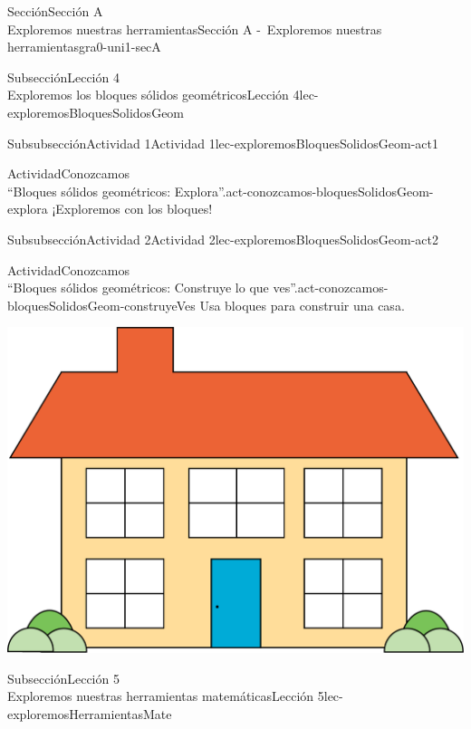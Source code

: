 \begin{sectionptx}{Sección}{{\Large Sección A\\}Exploremos nuestras herramientas}{}{Sección A -~Exploremos nuestras herramientas}{}{}{gra0-uni1-secA}
\begin{subsectionptx}{Subsección}{{\normalsize Lección 4\\[-0.05cm]}Exploremos los bloques sólidos geométricos}{}{Lección 4}{}{}{lec-exploremosBloquesSolidosGeom}
\begin{subsubsectionptx}{Subsubsección}{Actividad 1}{}{Actividad 1}{}{}{lec-exploremosBloquesSolidosGeom-act1}
\begin{activity}{Actividad}{Conozcamos\\``Bloques sólidos geométricos: Explora''.}{act-conozcamos-bloquesSolidosGeom-explora}%
¡Exploremos con los bloques!%
\end{activity}%
\end{subsubsectionptx}
%
%
\typeout{************************************************}
\typeout{************************************************}
%
\begin{subsubsectionptx}{Subsubsección}{Actividad 2}{}{Actividad 2}{}{}{lec-exploremosBloquesSolidosGeom-act2}
\begin{activity}{Actividad}{Conozcamos\\“Bloques sólidos geométricos: Construye lo que ves”.}{act-conozcamos-bloquesSolidosGeom-construyeVes}%
Usa bloques para construir una casa.%
\begin{image}{0}{1}{0}{}%
\includegraphics[width=\linewidth, center]{external/png-source/house.png}
\end{image}%
\end{activity}%
\end{subsubsectionptx}
\end{subsectionptx}
%
%
\typeout{************************************************}
\typeout{************************************************}
%
\begin{subsectionptx}{Subsección}{{\normalsize Lección 5\\[-0.05cm]}Exploremos nuestras herramientas matemáticas}{}{Lección 5}{}{}{lec-exploremosHerramientasMate}

\end{subsectionptx}
\end{sectionptx}
